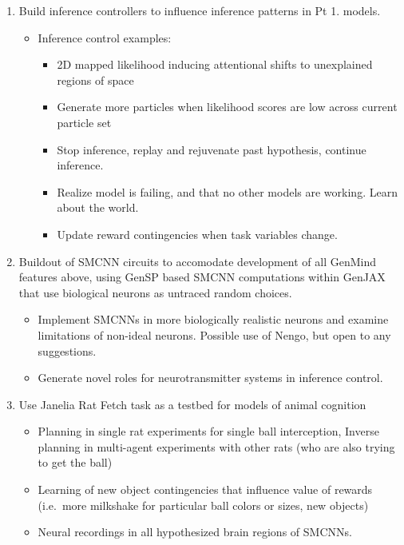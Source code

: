 \documentclass[
  letterpaper,
  DIV=11,
  numbers=noendperiod]{scrartcl}
\providecommand{\tightlist}{%
  \setlength{\itemsep}{0pt}\setlength{\parskip}{0pt}}\usepackage{longtable,booktabs,array}
\begin{document}
\begin{enumerate}
\def\labelenumi{\arabic{enumi}.}
\tightlist
\item
  Build inference controllers to influence inference patterns in Pt 1.
  models.

  \begin{itemize}
  \tightlist
  \item
    Inference control examples:

    \begin{itemize}
    \tightlist
    \item
      2D mapped likelihood inducing attentional shifts to unexplained
      regions of space
    \item
      Generate more particles when likelihood scores are low across
      current particle set
    \item
      Stop inference, replay and rejuvenate past hypothesis, continue
      inference.
    \item
      Realize model is failing, and that no other models are working.
      Learn about the world.
    \item
      Update reward contingencies when task variables change.
    \end{itemize}
  \end{itemize}
\item
  Buildout of SMCNN circuits to accomodate development of all GenMind
  features above, using GenSP based SMCNN computations within GenJAX
  that use biological neurons as untraced random choices.

  \begin{itemize}
  \tightlist
  \item
    Implement SMCNNs in more biologically realistic neurons and examine
    limitations of non-ideal neurons. Possible use of Nengo, but open to
    any suggestions.
  \item
    Generate novel roles for neurotransmitter systems in inference
    control.
  \end{itemize}
\item
  Use Janelia Rat Fetch task as a testbed for models of animal cognition

  \begin{itemize}
  \tightlist
  \item
    Planning in single rat experiments for single ball interception,
    Inverse planning in multi-agent experiments with other rats (who are
    also trying to get the ball)
  \item
    Learning of new object contingencies that influence value of rewards
    (i.e.~more milkshake for particular ball colors or sizes, new
    objects)
  \item
    Neural recordings in all hypothesized brain regions of SMCNNs.
  \end{itemize}
\end{enumerate}
\end{document}
